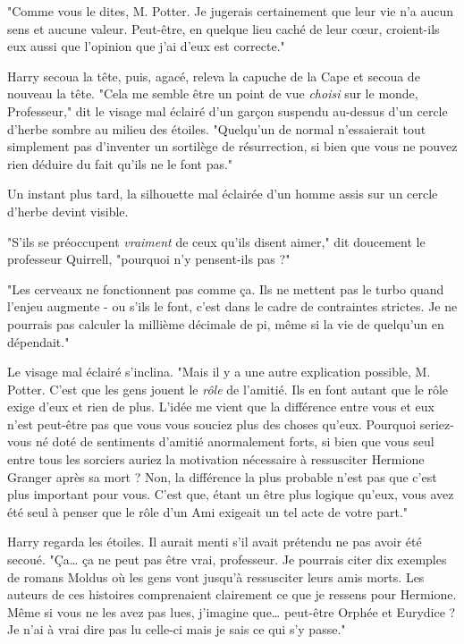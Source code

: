 "Comme vous le dites, M. Potter. Je jugerais certainement que leur vie n'a aucun sens et aucune valeur. Peut-être, en quelque lieu caché de leur cœur, croient-ils eux aussi que l'opinion que j'ai d'eux est correcte."

Harry secoua la tête, puis, agacé, releva la capuche de la Cape et secoua de nouveau la tête. "Cela me semble être un point de vue \emph{choisi}  sur le monde, Professeur," dit le visage mal éclairé d'un garçon suspendu au-dessus d'un cercle d'herbe sombre au milieu des étoiles. "Quelqu'un de normal n'essaierait tout simplement pas d'inventer un sortilège de résurrection, si bien que vous ne pouvez rien déduire du fait qu'ils ne le font pas."

Un instant plus tard, la silhouette mal éclairée d'un homme assis sur un cercle d'herbe devint visible.

"S'ils se préoccupent \emph{vraiment}  de ceux qu'ils disent aimer," dit doucement le professeur Quirrell, "pourquoi n'y pensent-ils pas ?"

"Les cerveaux ne fonctionnent pas comme ça. Ils ne mettent pas le turbo quand l'enjeu augmente - ou s'ils le font, c'est dans le cadre de contraintes strictes. Je ne pourrais pas calculer la millième décimale de pi, même si la vie de quelqu'un en dépendait."

Le visage mal éclairé s'inclina. "Mais il y a une autre explication possible, M. Potter. C'est que les gens jouent le \emph{rôle}  de l'amitié. Ils en font autant que le rôle exige d'eux et rien de plus. L'idée me vient que la différence entre vous et eux n'est peut-être pas que vous vous souciez plus des choses qu'eux. Pourquoi seriez-vous né doté de sentiments d'amitié anormalement forts, si bien que vous seul entre tous les sorciers auriez la motivation nécessaire à ressusciter Hermione Granger après sa mort ? Non, la différence la plus probable n'est pas que c'est plus important pour vous. C'est que, étant un être plus logique qu'eux, vous avez été seul à penser que le rôle d'un Ami exigeait un tel acte de votre part."

Harry regarda les étoiles. Il aurait menti s'il avait prétendu ne pas avoir été secoué. "Ça… ça ne peut pas être vrai, professeur. Je pourrais citer dix exemples de romans Moldus où les gens vont jusqu'à ressusciter leurs amis morts. Les auteurs de ces histoires comprenaient clairement ce que je ressens pour Hermione. Même si vous ne les avez pas lues, j'imagine que… peut-être Orphée et Eurydice ? Je n'ai à vrai dire pas lu celle-ci mais je sais ce qui s'y passe."

